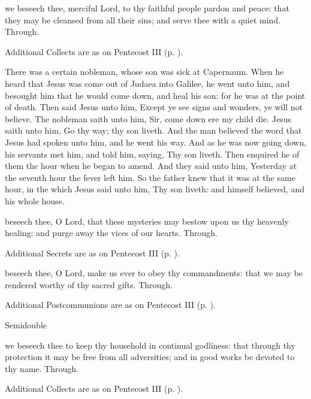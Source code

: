 \collect
{} we beseech thee, merciful Lord, to thy faithful people pardon and peace: that they may be cleansed from all their sins; and serve thee with a quiet mind. Through.
\begin{rubric}
    Additional Collects are as on Pentecost III (p. \pageref{PentecostIII}).
\end{rubric}

 There was a certain nobleman, whose son was sick at Capernaum. When he heard that Jesus was come out of Judaea into Galilee, he went unto him, and besought him that he would come down, and heal his son: for he was at the point of death. Then said Jesus unto him, Except ye see signs and wonders, ye will not believe. The nobleman saith unto him, Sir, come down ere my child die. Jesus saith unto him, Go thy way; thy son liveth. And the man believed the word that Jesus had spoken unto him, and he went his way. And as he was now going down, his servants met him, and told him, saying, Thy son liveth. Then enquired he of them the hour when he began to amend. And they said unto him, Yesterday at the seventh hour the fever left him. So the father knew that it was at the same hour, in the which Jesus said unto him, Thy son liveth: and himself believed, and his whole house.

\secret
{} beseech thee, O Lord, that these mysteries may bestow upon us thy heavenly healing: and purge away the vices of our hearts. Through.
\begin{rubric}
    Additional Secrets are as on Pentecost III (p. \pageref{PentecostIII}).
\end{rubric}

\postcommunion
{} beseech thee, O Lord, make us ever to obey thy commandments: that we may be rendered worthy of thy sacred gifts. Through.
\begin{rubric}
    Additional Postcommunions are as on Pentecost III (p. \pageref{PentecostIII}).
\end{rubric}

\label{trinity}
\begin{inhead}
{Semidouble}
\end{inhead}

\collect
{} we beseech thee to keep thy household in continual godliness: that through thy protection it may be free from all adversities; and in good works be devoted to thy name. Through.
\begin{rubric}
    Additional Collects are as on Pentecost III (p. \pageref{PentecostIII}).
\end{rubric}

